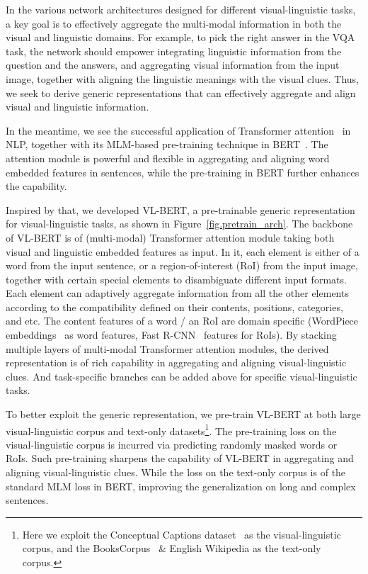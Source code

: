 In the various network architectures designed for different visual-linguistic tasks, a key goal is to effectively aggregate the multi-modal information in both the visual and linguistic domains. For example, to pick the right answer in the VQA task, the network should empower integrating linguistic information from the question and the answers, and aggregating visual information from the input image, together with aligning the linguistic meanings with the visual clues. Thus, we seek to derive generic representations that can effectively aggregate and align visual and linguistic information.

In the meantime, we see the successful application of Transformer attention~\citep{vaswani2017transformer} in NLP, together with its MLM-based pre-training  technique in BERT~\citep{devlin2018bert}. The attention module is powerful and flexible in aggregating and aligning word embedded features in sentences, while the pre-training in BERT further enhances the capability.

Inspired by that, we developed VL-BERT, a pre-trainable generic representation for visual-linguistic tasks, as shown in Figure~\ref{fig.pretrain_arch}. The backbone of VL-BERT is of (multi-modal) Transformer attention module taking both visual and linguistic embedded features as input. In it, each element is either of a word from the input sentence, or a region-of-interest (RoI) from the input image, together with certain special elements to disambiguate different input formats. Each element can adaptively aggregate information from all the other elements according to the compatibility defined on their contents, positions, categories, and etc. The content features of a word / an RoI are domain specific (WordPiece embeddings~\citep{wu2016google} as word features, Fast R-CNN~\citep{girshick2015fast} features for RoIs). By stacking multiple layers of multi-modal Transformer attention modules, the derived representation is of rich capability in aggregating and aligning visual-linguistic clues. And task-specific branches can be added above for specific visual-linguistic tasks.

To better exploit the generic representation, we pre-train VL-BERT at both large visual-linguistic corpus and text-only datasets\footnote{Here we exploit the Conceptual Captions dataset~\citep{sharma2018conceptual} as the visual-linguistic corpus, and the BooksCorpus~\citep{zhu2015aligning} \& English Wikipedia as the text-only corpus.}. The pre-training loss on the visual-linguistic corpus is incurred via predicting randomly masked words or RoIs. Such pre-training sharpens the capability of VL-BERT in aggregating and aligning visual-linguistic clues. While the loss on the text-only corpus is of the standard MLM loss in BERT, improving the generalization on long and complex sentences. 

